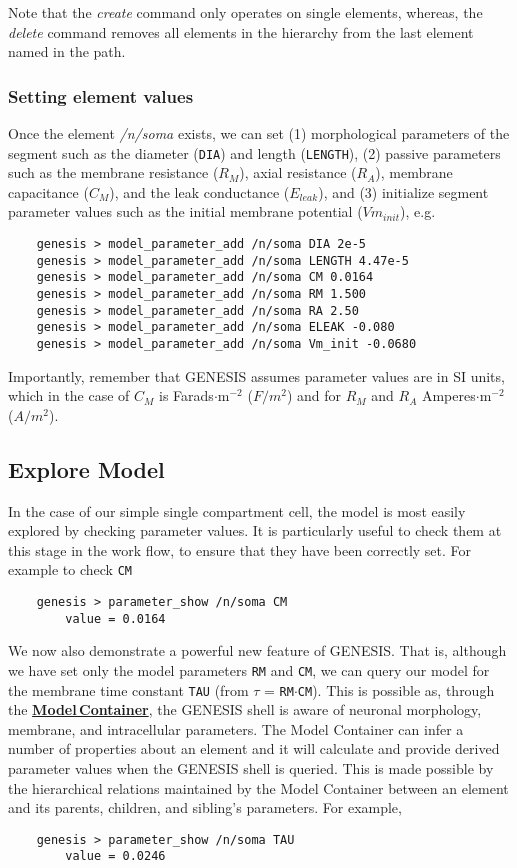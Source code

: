 \documentclass[12pt]{article}
\begin{document}
Note that the {\it create} command only operates on single elements, whereas, the {\it delete} command removes all elements in the hierarchy from the last element named in the path.

\subsubsection*{Setting element values}

Once the element {\it /n/soma} exists, we can set (1) morphological  parameters of the segment such as the diameter ({\tt DIA}) and length ({\tt LENGTH}), (2) passive parameters such as  the membrane resistance ($R_M$), axial resistance ($R_A$), membrane capacitance ($C_M$), and the leak conductance ($E_{leak}$), and (3) initialize segment parameter values such as the initial membrane potential ($Vm_{init}$), e.g.
\begin{verbatim}
    genesis > model_parameter_add /n/soma DIA 2e-5
    genesis > model_parameter_add /n/soma LENGTH 4.47e-5
    genesis > model_parameter_add /n/soma CM 0.0164
    genesis > model_parameter_add /n/soma RM 1.500
    genesis > model_parameter_add /n/soma RA 2.50
    genesis > model_parameter_add /n/soma ELEAK -0.080
    genesis > model_parameter_add /n/soma Vm_init -0.0680
\end{verbatim}

Importantly, remember that GENESIS assumes parameter values are in SI units, which in the case of $C_M$ is Farads$\cdot$m$^{-2}$ ($F/m^2$) and for $R_M$ and $R_A$ Amperes$\cdot$m$^{-2}$ ($A/m^2$).

\subsection*{Explore Model}

In the case of our simple single compartment cell, the model is most easily explored by checking parameter values. It is particularly useful to check them at this stage in the work flow, to ensure that they have been correctly set. For example to check {\tt CM}
\begin{verbatim}
    genesis > parameter_show /n/soma CM
        value = 0.0164
\end{verbatim}

We now also demonstrate a powerful new feature of GENESIS. That is, although we have set only the model parameters {\tt RM} and {\tt CM}, we can query our model for the membrane time constant {\tt TAU} (from $\tau$ = {\tt RM}$\cdot${\tt CM}). This is possible as, through the \href{../model-container/model-container.tex}{\bf Model\,Container}, the GENESIS shell is aware of neuronal morphology, membrane, and intracellular parameters. The Model Container can infer a number of properties about an element and it will calculate and provide derived parameter values when the GENESIS shell is queried. This is made possible by the hierarchical relations maintained by the Model Container between an element and its parents, children, and sibling's parameters. For example,
\begin{verbatim}
    genesis > parameter_show /n/soma TAU
        value = 0.0246
\end{verbatim}
\end{document}

